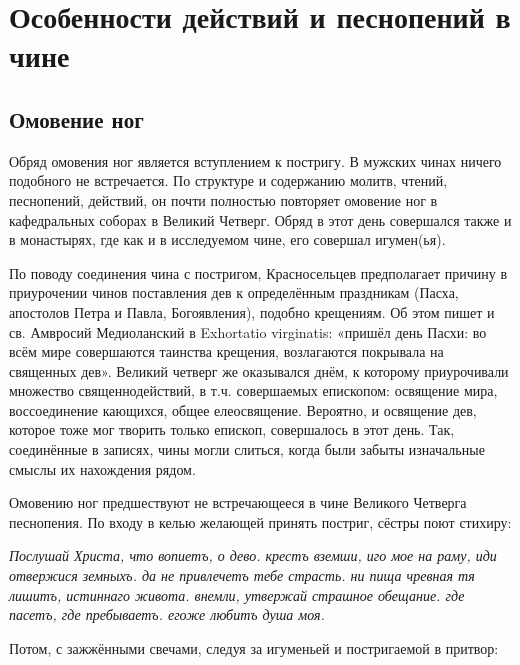 \chapter{Особенности действий и песнопений в чине}\label{ux433ux43bux430ux432ux430-2-ux43eux441ux43eux431ux435ux43dux43dux43eux441ux442ux438-ux434ux435ux439ux441ux442ux432ux438ux439-ux438-ux43fux435ux441ux43dux43eux43fux435ux43dux438ux439-ux432-ux447ux438ux43dux435}

\section*{Омовение ног}\label{ux43eux43cux43eux432ux435ux43dux438ux435-ux43dux43eux433-1}

Обряд омовения ног является вступлением к постригу.
В мужских чинах ничего подобного не встречается.
По структуре и содержанию молитв, чтений, песнопений, действий, он почти полностью повторяет омовение ног в кафедральных соборах в Великий Четверг.
Обряд в этот день совершался также и в монастырях, где как и в исследуемом чине, его совершал игумен(ья)\cite[С.~149]{krasnoseltcev.uprazdnenniye.1889}.

По поводу соединения чина с постригом, Красносельцев предполагает причину в приурочении чинов поставления дев к определённым праздникам (Пасха, апостолов Петра и Павла, Богоявления), подобно крещениям.
Об этом пишет и св. Амвросий Медиоланский в Exhortatio virginatis: «пришёл день Пасхи: во всём мире совершаются таинства крещения, возлагаются покрывала на священных дев».
Великий четверг же оказывался днём, к которому приурочивали множество священнодействий, в т.ч. совершаемых епископом: освящение мира, воссоединение кающихся, общее елеосвящение.
Вероятно, и освящение дев, которое тоже мог творить только епископ, совершалось в этот день.
Так, соединённые в записях, чины могли слиться, когда были забыты изначальные смыслы их нахождения рядом\cite[С.~150]{krasnoseltcev.uprazdnenniye.1889}.

Омовению ног предшествуют не встречающееся в чине Великого Четверга песнопения.
По входу в келью желающей принять постриг, сёстры поют стихиру:

\textit{Послушай Христа, что вопиетъ, о дево. крестъ вземши, иго мое на раму, иди отвержися земныхъ. да не привлечетъ тебе страсть. ни пища чревная тя лишитъ, истиннаго живота. внемли, утвержай страшное обещание. где пасетъ, где пребываетъ. егоже любитъ душа моя.
}

Потом, с зажжёнными свечами, следуя за игуменьей и постригаемой в притвор:

